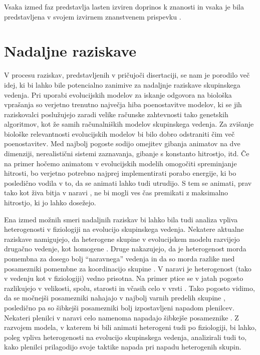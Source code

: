 \begin{razsirjeniPovzetek}
Vsaka izmed faz predstavlja lasten izviren doprinos k znanosti in vsaka je bila predstavljena v svojem izvirnem znanstvenem prispevku \cite{demsar2014simulated,demsar2015simulating,demsar2017evolution,demsar2016balanced}.

\section{Nadaljne raziskave}

V procesu raziskav, predstavljenih v pričujoči disertaciji, se nam je porodilo več idej, ki bi lahko bile potencialno zanimive za nadaljnje raziskave skupinskega vedenja. Pri uporabi evolucijskih modelov za iskanje odgovora na biološka vprašanja so verjetno trenutno največja hiba poenostavitve modelov, ki se jih raziskovalci poslužujejo zaradi velike računske zahtevnosti tako genetskih algoritmov, kot že samih računalniških modelov skupinskega vedenja. Za zvišanje biološke relevantnosti evolucijskih modelov bi bilo dobro odstraniti čim več poenostavitev. Med najbolj pogoste sodijo omejitev gibanja animatov na dve dimenziji, nerealistični sistemi zaznavanja, gibanje s konstanto hitrostjo, itd. Če na primer hočemo animatom v evolucijskih modelih omogočiti spreminjanje hitrosti, bo verjetno potrebno najprej implementirati porabo energije, ki bo posledično vodila v to, da se animati lahko tudi utrudijo. S tem se animati, prav tako kot živa bitja v naravi \cite{norin2016measurement,roche2013finding}, ne bi mogli ves čas premikati z maksimalno hitrostjo, ki jo lahko dosežejo.

Ena izmed možnih smeri nadaljnih raziskav bi lahko bila tudi analiza vpliva heterogenosti v fiziologiji na evolucijo skupinskega vedenja. Nekatere aktualne raziskave namigujejo, da heterogene skupine v evolucijskem modelu razvijejo drugačno vedenje, kot homogene \cite{olson2015exploring}. Druge nakazujejo, da je heterogenost morda pomembna za dosego bolj ``naravnega'' vedenja \cite{demsar2013family} in da so morda razlike med posamezniki pomembne za koordinacijo skupine \cite{marras2012information,marras2013schooling}. V naravi je heterogenost (tako v vedenju kot v fiziologiji) vedno prisotna. Na primer ptice se v jatah pogosto razlikujejo v velikosti, spolu, starosti in včasih celo v vrsti \cite{lebarbajec2009organized,jolles2013heterogeneous}. Tako pogosto vidimo, da se močnejši posamezniki nahajajo v najbolj varnih predelih skupine \cite{hamilton1971geometry}, posledično pa so šibkejši posamezniki bolj izpostavljeni napadom plenilcev. Nekateri plenilci v naravi celo namenoma napadajo šibkejše posameznike \cite{domenici2014howsailfish,marras2015notsofast}. Z razvojem modela, v katerem bi bili animati heterogeni tudi po fiziologiji, bi lahko, poleg vpliva heterogenosti na evolucijo skupinskega vedenja, analizirali tudi to, kako plenilci prilagodijo svoje taktike napada pri napadu heterogenih skupin.


\end{razsirjeniPovzetek}
